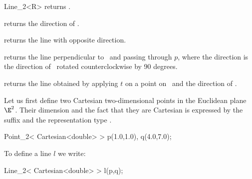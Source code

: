 \begin{ccRefClass} {Line_2<R>}
       {}
\ccGlue
{}
       {returns .}
\ccGlue
{}
       {}
\ccGlue
{}
       {}


       {returns the direction of \ccVar.}

       {returns the line with opposite direction.}

        {returns the line perpendicular to \ccVar\ and passing through $p$,
         where the direction is the direction of \ccVar\ rotated 
         counterclockwise by 90 degrees.}

       {returns the line obtained by applying $t$ on a point on \ccVar\ 
        and the direction of \ccVar.}



\ccExample
Let us first define two Cartesian two-dimensional points in the Euclidean 
plane $\E^2$. Their
dimension and the fact that they are Cartesian is expressed by
the suffix  and the representation type .

\begin{cprog}

  Point_2< Cartesian<double> >  p(1.0,1.0), q(4.0,7.0);
\end{cprog} 

To define a line $l$ we write:

\begin{cprog}

  Line_2< Cartesian<double> > l(p,q);
\end{cprog} 


\end{ccRefClass} 
